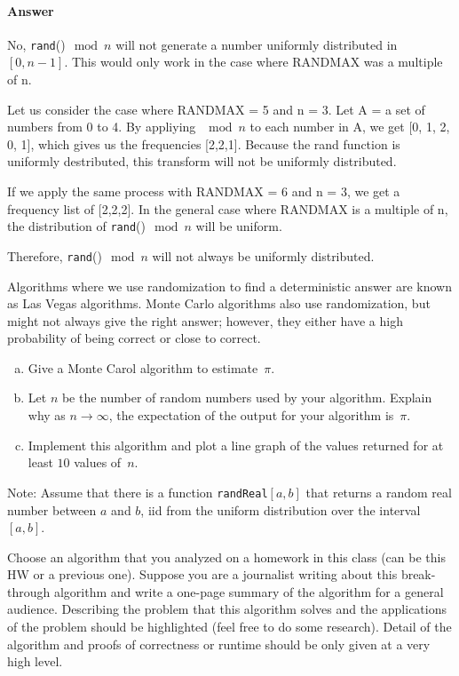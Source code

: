\documentclass{article}
\begin{document}

\paragraph{Answer}
No, \texttt{rand}()$\mod n$ will not generate a number uniformly distributed in
$[0,n-1]$. This would only work in the case where RANDMAX was a multiple of n.

Let us consider the case where RANDMAX = 5 and n = 3. Let A = a set of numbers from
0 to 4. By appliying $\mod n$ to each number in A, we get [0, 1, 2, 0, 1], which
gives us the frequencies [2,2,1]. Because the rand function is uniformly destributed,
this transform will not be uniformly distributed.

If we apply the same process with RANDMAX = 6 and n = 3, we get a frequency list of
[2,2,2]. In the general case where RANDMAX is a multiple of n, the distribution of
\texttt{rand}()$\mod n$ will be uniform.

Therefore, \texttt{rand}()$\mod n$ will not always be uniformly distributed.



\collab{\todo{}}
\nextprob{}

Algorithms where we use randomization to find a deterministic answer are known
as Las Vegas algorithms.  Monte Carlo algorithms also use randomization, but
might not always give the right answer; however, they either have a high
probability of being correct or close to correct.

\begin{enumerate}[(a)]
    \item Give a Monte Carol algorithm to estimate~$\pi$.
    \item Let $n$ be the number of random numbers used by your algorithm.
        Explain why as $n \to \infty$, the expectation of the output for your
        algorithm is~$\pi$.
    \item Implement this algorithm and plot a line graph of
        the values returned for at least $10$ values of~$n$.
\end{enumerate}

Note: Assume that there is a function \texttt{randReal}$[a,b]$ that returns a random
real number between $a$ and $b$, iid from the uniform distribution over the
interval $[a,b]$.



\collab{\todo{}}
\nextprob{}

Choose an algorithm that you analyzed on a homework in this class (can be this
HW or a previous one).  Suppose you are a journalist writing about this
break-through algorithm and write a one-page summary of the algorithm for a
general audience.  Describing the problem that this algorithm solves and the
applications of the problem should be highlighted (feel free to do some
research).  Detail of the algorithm and proofs of correctness or runtime should
be only given at a very high level.
\end{document}
